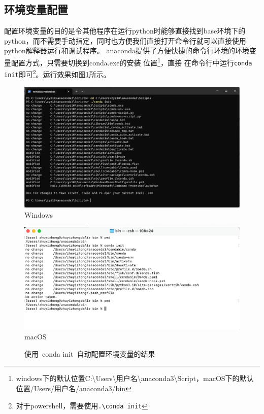 \subsection{环境变量配置}
配置环境变量的目的是令其他程序在运行python时能够直接找到base环境下的python，而不需要手动指定，同时也方便我们直接打开命令行就可以直接使用python解释器运行和调试程序。
anaconda提供了方便快捷的命令行环境的环境变量配置方式，只需要切换到conda.exe的安装
位置\footnote{windows下的默认位置C:\textbackslash Users\textbackslash 用户名\textbackslash anaconda3\textbackslash Script，macOS下的默认位置/Users/用户名/anaconda3/bin}，直接
在命令行中运行{\texttt{conda init}}即可\footnote{对于powershell，需要使用\texttt{.\textbackslash conda init}}。运行效果如图\ref{fig:condaInit}所示。
\begin{figure}[htbp]
    \begin{minipage}[t]{0.4\linewidth}
        \centering
        \includegraphics[height=0.5\linewidth]{pic/conda_init_windows.png}
        Windows
    \end{minipage}
    \hfill
    \begin{minipage}[t]{0.4\linewidth}
        \centering
        \includegraphics[height=0.5\linewidth]{pic/conda_init_macos.png}
        macOS
    \end{minipage}
    \hfill
    \caption{使用~conda init~自动配置环境变量的结果}
    \label{fig:condaInit}
\end{figure}

